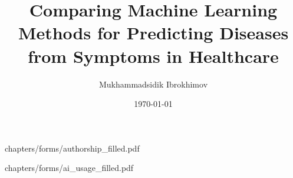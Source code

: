 \documentclass[12pt, a4paper, oneside]{report}
\title{Comparing Machine Learning Methods for Predicting Diseases from Symptoms in Healthcare}
\author{Mukhammadsidik Ibrokhimov}
\date{\today}
\begin{document}



%
  {chapters/forms/authorship_filled.pdf}

%
  {chapters/forms/ai_usage_filled.pdf}

\tableofcontents
\listoffigures
\listoftables





\clearpage
{}
\setcounter{page}{1}














\begin{appendices}

\end{appendices}
\end{document}
